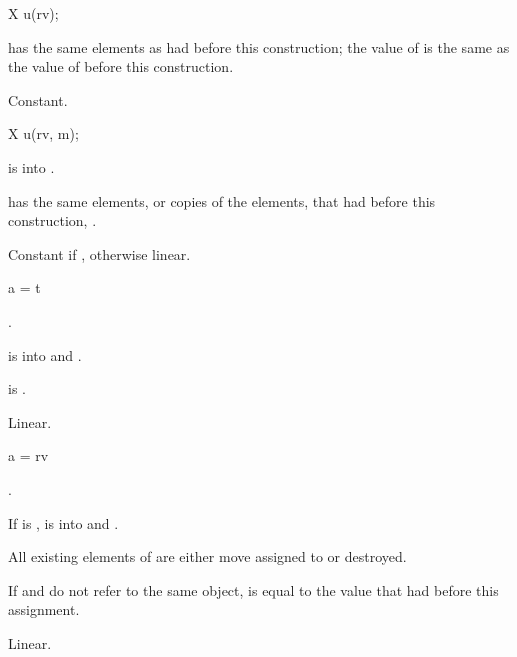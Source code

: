 \begin{itemdecl}
X u(rv);
\end{itemdecl}

\begin{itemdescr}
\pnum
\ensures
{} has the same elements as  had before this construction;
the value of  is the same as
the value of  before this construction.

\pnum
\complexity
Constant.
\end{itemdescr}

\begin{itemdecl}
X u(rv, m);
\end{itemdecl}

\begin{itemdescr}
\pnum
\expects
{} is  into .

\pnum
\ensures
{} has the same elements, or copies of the elements,
that  had before this construction,
.

\pnum
\complexity
Constant if , otherwise linear.
\end{itemdescr}

\begin{itemdecl}
a = t
\end{itemdecl}

\begin{itemdescr}
\pnum
\result
{}.

\pnum
\expects
{} is  into  and
.

\pnum
\ensures
{} is .

\pnum
\complexity
Linear.
\end{itemdescr}

%
\begin{itemdecl}
a = rv
\end{itemdecl}

\begin{itemdescr}
\pnum
\result
{}.

\pnum
\expects
If
is ,
 is  into  and
.

\pnum
\effects
All existing elements of  are either move assigned to or destroyed.

\pnum
\ensures
If  and  do not refer to the same object,
 is equal to the value that  had before this assignment.

\pnum
\complexity
Linear.
\end{itemdescr}

